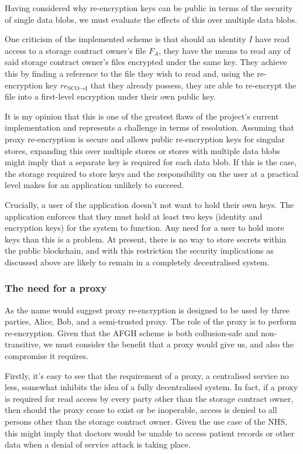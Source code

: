 Having considered why re-encryption keys can be public in terms of the security of single data blobs, we must evaluate the effects of this over multiple data blobs.

One criticism of the implemented scheme is that should an identity $I$ have read access to a storage contract owner's file $F_A$, they have the means to read any of said storage contract owner's files encrypted under the same key. They achieve this by finding a reference to the file they wish to read and, using the re-encryption key $re_{\text{SCO} \rightarrow \text{I}}$ that they already possess, they are able to re-encrypt the file into a first-level encryption under their own public key.

It is my opinion that this is one of the greatest flaws of the project's current implementation and represents a challenge in terms of resolution. Assuming that proxy re-encryption is secure and allows public re-encryption keys for singular stores, expanding this over multiple stores or stores with multiple data blobs might imply that a separate key is required for each data blob. If this is the case, the storage required to store keys and the responsibility on the user at a practical level makes for an application unlikely to succeed.

Crucially, a user of the application doesn't not want to hold their own keys. The application enforces that they must hold at least two keys (identity and encryption keys) for the system to function. Any need for a user to hold more keys than this is a problem. At present, there is no way to store secrets within the public blockchain, and with this restriction the security implications as discussed above are likely to remain in a completely decentralised system.

\subsubsection{The need for a proxy}

As the name would suggest proxy re-encryption is designed to be used by three parties, Alice, Bob, and a semi-trusted proxy. The role of the proxy is to perform re-encryption. Given that the AFGH scheme is both collusion-safe and non-transitive, we must consider the benefit that a proxy would give us, and also the compromise it requires.

Firstly, it's easy to see that the requirement of a proxy, a centralised service no less, somewhat inhibits the idea of a fully decentralised system. In fact, if a proxy is required for read access by every party other than the storage contract owner, then should the proxy cease to exist or be inoperable, access is denied to all persons other than the storage contract owner. Given the use case of the NHS, this might imply that doctors would be unable to access patient records or other data when a denial of service attack is taking place.

